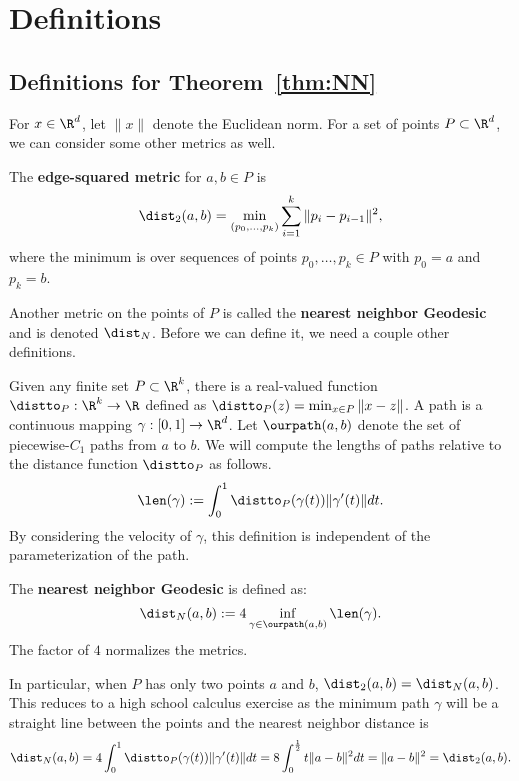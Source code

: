 
\section{Definitions} %
\label{sec:definitions}

\subsection{Definitions for Theorem~\ref{thm:NN}}
  For $x\in \R^d$, let $\|x\|$ denote the Euclidean norm.
  For a set of points $P\subset \R^d$, we can consider some other metrics as well.
  
  
  \begin{definition}
  The \textbf{edge-squared metric} for $a,b\in P$ is
  \[
    \dist_2(a,b) = \min_{(p_0,\ldots, p_k)}\sum_{i=1}^k \|p_i - p_{i-1}\|^2,
  \]
  where the minimum is over sequences of points $p_0,\ldots, p_k\in P$ with $p_0 = a$ and $p_k = b$.
  \end{definition}

  Another metric on the points of $P$ is called the \textbf{nearest neighbor Geodesic} and is denoted $\dist_N$.
  Before we can define it, we need a couple other definitions.

  Given any finite set $P\subset \R^k$, there is a real-valued function $\distto_P: \R^k\to \R$ defined as $\distto_P(z) = \min_{x\in P} \|x-z\|$.
  A path is a continuous mapping $\gamma:[0,1]\to \R^d$.
  Let $\ourpath(a,b)$ denote the set of piecewise-$C_1$ paths from $a$ to $b$.
  We will compute the lengths of paths relative to the distance function $\distto_P$ as follows.
  \[
    \len(\gamma) := \int_0^1 \distto_P(\gamma(t))\|\gamma'(t)\|dt.
  \]
  By considering the velocity of $\gamma$, this definition is
  independent of the parameterization of the path.
  \begin{definition}
    The \textbf{nearest neighbor Geodesic} is defined as:
  \[
    \dist_N(a,b) := 4 \inf_{\gamma\in \ourpath(a,b)}\len(\gamma).
  \]
  The factor of $4$ normalizes the metrics.
  \end{definition}
  In particular, when $P$ has only two points $a$ and $b$, $\dist_2(a,b) = \dist_N(a,b)$.
  This reduces to a high school calculus exercise as the minimum path $\gamma$ will be a straight line between the points and the nearest neighbor distance is
  \[
    \dist_N(a,b) = 4\int_0^1 \distto_P(\gamma(t))\|\gamma'(t)\|dt = 8\int_0^{\frac{1}{2}} t \|a - b\|^2 dt = \|a - b\|^2 = \dist_2(a,b).
  \]

